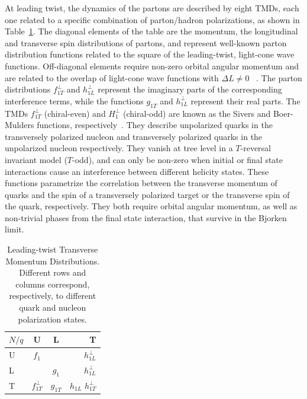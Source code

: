 At leading twist, the dynamics of the partons are described by eight TMDs, each one related to a specific combination of parton/hadron polarizations, as shown in Table~\ref{tab::tmds}. 
The diagonal elements of the table are the momentum, the longitudinal and transverse spin distributions of partons, and represent well-known parton distribution functions related to the square of the leading-twist, light-cone wave functions. Off-diagonal elements require non-zero orbital angular momentum and are related to the overlap of light-cone wave functions with $\Delta L \neq 0$ ~\cite{Ji:2002xn}.  The parton distributions $f_{1T}^\perp$ and $h_{1L}^\perp$ represent the imaginary parts of the corresponding interference terms, while the functions $g_{1T}$ and $h_{1L}^\perp$ represent their real parts. The TMDs $f_{1T}^\perp$ (chiral-even) and $H_{1}^\perp$ (chiral-odd) are known as the Sivers and Boer-Mulders functions, respectively~\cite{Sivers:1990fh,Anselmino:1998yz,Brodsky:2002rv,
Collins:2002kn,Ji:2002aa,Belitsky:2002sm}. They describe unpolarized quarks in the transversely polarized nucleon and transversely polarized quarks in the unpolarized nucleon respectively. 
They vanish at tree level in a $T$-reversal invariant model ($T$-odd), and can only be non-zero when initial or final state interactions cause an interference between different helicity states. These functions parametrize the correlation between the transverse momentum of quarks and the spin of a transversely polarized target or the transverse spin of the quark, respectively. They both require orbital angular momentum, as well as non-trivial phases from the final state interaction, that survive in the Bjorken limit.\\
%
\begin{table}
\centering
\begin{tabular}{l|c|c|r}
$N/q$ & U                 & L        & T                 \\\hline\hline
U     & $f_1$             &          & $h_{1L}^{\perp}$     \\\hline
L     &                   & $g_1$    & $h_{1 L}^{\perp}$ \\\hline
T     & $f_{1 T}^{\perp}$ & $g_{1 T}$ & $h_{1L}$ $h_{1 T}^{\perp}$\\\hline\hline
\end{tabular}
\caption{\label{tab::tmds} Leading-twist Transverse Momentum Distributions. Different rows and columns correspond, respectively, to different quark and nucleon polarization states.}
\end{table}
